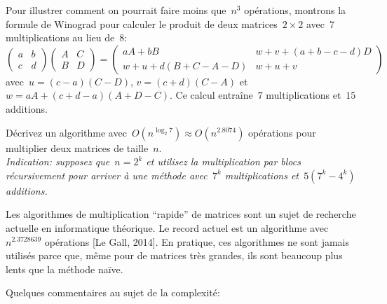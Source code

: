 Pour illustrer comment on pourrait faire moins que~$n^3$ opérations, montrons
la formule de Winograd pour calculer le produit de deux
matrices~$2\times 2$ avec~$7$ multiplications au lieu de~$8$:
\[
	\begin{pmatrix}
		a & b \\ c & d
	\end{pmatrix}
	\begin{pmatrix}
		A & C \\ B & D
	\end{pmatrix}
	=
	\begin{pmatrix}
		aA+bB & w+v+(a+b-c-d)D \\
		w+u+d(B+C-A-D) & w+u+v
	\end{pmatrix}
\]
avec~$u=(c-a)(C-D)$, $v=(c+d)(C-A)$ et~$w=aA+(c+d-a)(A+D-C)$.  Ce calcul
entraîne~$7$ multiplications et~$15$ additions.

\begin{exercice}
	Décrivez un algorithme avec~$O(n^{\log_2 7})\approx O(n^{2.8074})$ opérations
	pour multiplier deux matrices de taille~$n$.\\
	\emph{Indication: supposez que~$n=2^k$ et utilisez la
		multiplication par blocs récursivement pour arriver à une méthode
		avec~$7^k$ multiplications et~$5(7^k-4^k)$ additions.
	}
\end{exercice}

Les algorithmes de multiplication ``rapide'' de matrices sont un sujet de
recherche actuelle en informatique théorique.  Le record actuel est un
algorithme avec $n^{2.3728639}$ opérations [Le Gall, 2014].  En pratique, ces
algorithmes ne sont jamais utilisés parce que, même pour de matrices très
grandes, ils sont beaucoup plus lents que la méthode naïve.

Quelques commentaires au sujet de la complexité:

